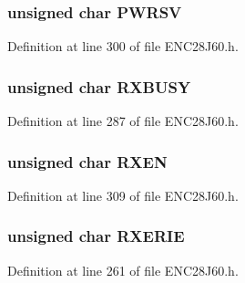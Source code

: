 \hypertarget{union___r_e_g_a384a428cc4d3c8ae2ca15bd9e9d1af3c}{}
\subsubsection[{P\+W\+R\+S\+V}]{\setlength{\rightskip}{0pt plus 5cm}unsigned {\bf char} P\+W\+R\+S\+V}\label{union___r_e_g_a384a428cc4d3c8ae2ca15bd9e9d1af3c}


Definition at line 300 of file E\+N\+C28\+J60.\+h.

\hypertarget{union___r_e_g_ab8e3c2f5d46f607fe46f344b6ce6313d}{}
\subsubsection[{R\+X\+B\+U\+S\+Y}]{\setlength{\rightskip}{0pt plus 5cm}unsigned {\bf char} R\+X\+B\+U\+S\+Y}\label{union___r_e_g_ab8e3c2f5d46f607fe46f344b6ce6313d}


Definition at line 287 of file E\+N\+C28\+J60.\+h.

\hypertarget{union___r_e_g_a5bae594c0ed2351df1054fd2d0e5c4c5}{}
\subsubsection[{R\+X\+E\+N}]{\setlength{\rightskip}{0pt plus 5cm}unsigned {\bf char} R\+X\+E\+N}\label{union___r_e_g_a5bae594c0ed2351df1054fd2d0e5c4c5}


Definition at line 309 of file E\+N\+C28\+J60.\+h.

\hypertarget{union___r_e_g_ab062efc1f39c9ffdcfed97960885aca0}{}
\subsubsection[{R\+X\+E\+R\+I\+E}]{\setlength{\rightskip}{0pt plus 5cm}unsigned {\bf char} R\+X\+E\+R\+I\+E}\label{union___r_e_g_ab062efc1f39c9ffdcfed97960885aca0}


Definition at line 261 of file E\+N\+C28\+J60.\+h.


